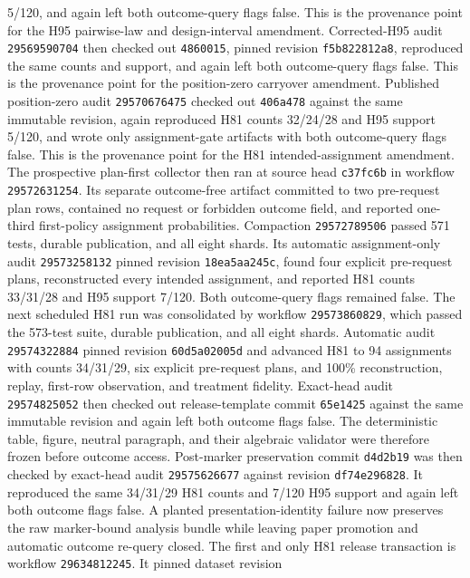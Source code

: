 \documentclass[11pt]{article}
\newcommand{\1}{\mathbf{1}}
\begin{document}
5/120, and again left both outcome-query flags false.  This is the provenance
point for the H95 pairwise-law and design-interval amendment.
Corrected-H95 audit \texttt{29569590704} then checked out \texttt{4860015},
pinned revision \texttt{f5b822812a8}, reproduced the same counts and support,
and again left both outcome-query flags false.  This is the provenance point for
the position-zero carryover amendment.  Published position-zero audit
\texttt{29570676475} checked out \texttt{406a478} against the same immutable
revision, again reproduced H81 counts 32/24/28 and H95 support 5/120, and wrote
only assignment-gate artifacts with both outcome-query flags false.  This is the
provenance point for the H81 intended-assignment amendment.
The prospective plan-first collector then ran at source head \texttt{c37fc6b} in
workflow \texttt{29572631254}.  Its separate outcome-free artifact committed to
two pre-request plan rows, contained no request or forbidden outcome field, and
reported one-third first-policy assignment probabilities.  Compaction
\texttt{29572789506} passed 571 tests, durable publication, and all eight shards.
Its automatic assignment-only audit \texttt{29573258132} pinned revision
\texttt{18ea5aa245c}, found four explicit pre-request plans, reconstructed every
intended assignment, and reported H81 counts 33/31/28 and H95 support 7/120.
Both outcome-query flags remained false.
The next scheduled H81 run was consolidated by workflow
\texttt{29573860829}, which passed the 573-test suite, durable publication, and
all eight shards.  Automatic audit \texttt{29574322884} pinned revision
\texttt{60d5a02005d} and advanced H81 to 94 assignments with counts 34/31/29,
six explicit pre-request plans, and 100\% reconstruction, replay, first-row
observation, and treatment fidelity.  Exact-head audit
\texttt{29574825052} then checked out release-template commit
\texttt{65e1425} against the same immutable revision and again left both outcome
flags false.  The deterministic table, figure, neutral paragraph, and their
algebraic validator were therefore frozen before outcome access.
Post-marker preservation commit \texttt{d4d2b19} was then checked by exact-head
audit \texttt{29575626677} against revision \texttt{df74e296828}.  It reproduced
the same 34/31/29 H81 counts and 7/120 H95 support and again left both outcome
flags false.  A planted presentation-identity failure now preserves the raw
marker-bound analysis bundle while leaving paper promotion and automatic
outcome re-query closed.
The first and only H81 release transaction is workflow
\texttt{29634812245}.  It pinned dataset revision
\end{document}
